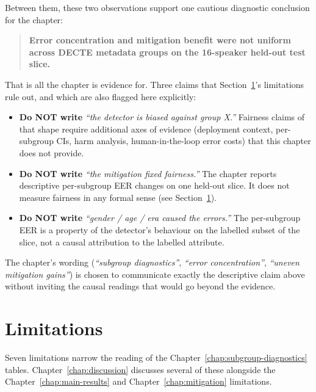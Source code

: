 Between them, these two observations support one cautious
diagnostic conclusion for the chapter:

\begin{quote}
\textbf{Error concentration and mitigation benefit were not uniform
across DECTE metadata groups on the 16-speaker held-out test
slice.}
\end{quote}

That is all the chapter is evidence for. Three claims that
Section~\ref{sec:subgroup-limitations}'s limitations rule out, and which are also flagged
here explicitly:

\begin{itemize}
    \item \textbf{Do NOT write} \emph{``the detector is biased against group X.''}
        Fairness claims of that shape require additional axes of
        evidence (deployment context, per-subgroup CIs, harm analysis,
        human-in-the-loop error costs) that this chapter does not
        provide.
    \item \textbf{Do NOT write} \emph{``the mitigation fixed fairness.''} The chapter
        reports descriptive per-subgroup EER changes on one held-out
        slice. It does not measure fairness in any formal sense (see
        Section~\ref{sec:subgroup-limitations}).
    \item \textbf{Do NOT write} \emph{``gender / age / era caused the errors.''}
        The per-subgroup EER is a property of the detector's behaviour
        on the labelled subset of the slice, not a causal
        attribution to the labelled attribute.
\end{itemize}

The chapter's wording (\emph{``subgroup diagnostics''}, \emph{``error
concentration''}, \emph{``uneven mitigation gains''}) is chosen to
communicate exactly the descriptive claim above without inviting
the causal readings that would go beyond the evidence.


\section{Limitations}
\label{sec:subgroup-limitations}

Seven limitations narrow the reading of the Chapter~\ref{chap:subgroup-diagnostics} tables.
Chapter~\ref{chap:discussion} discusses several of these alongside the Chapter~\ref{chap:main-results} and
Chapter~\ref{chap:mitigation} limitations.

